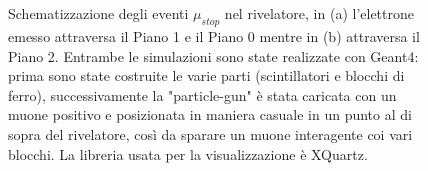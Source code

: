 \documentclass{standalone}
\begin{document}
\begin{figure}[H]
  \centering
  \\
  \\
  \caption{Schematizzazione degli eventi $\mu_{stop}$ nel rivelatore, in (a) l'elettrone emesso attraversa il Piano 1 e il Piano 0 mentre in (b) attraversa il Piano 2. Entrambe le simulazioni sono state realizzate con Geant4: prima sono state costruite le varie parti (scintillatori e blocchi di ferro), successivamente la "particle-gun" \`e stata caricata con un muone positivo e posizionata in maniera casuale in un punto al di sopra del rivelatore, così da sparare un muone interagente coi vari blocchi. La libreria usata per la visualizzazione \`e XQuartz.}
  \label{fig:mu_stops}
\end{figure}
\end{document}
